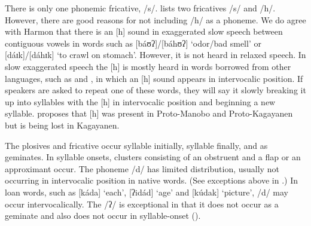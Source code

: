  There is only one phonemic fricative, /s/. \citet[21--22]{harmon1977} lists two fricatives /s/ and /h/. However, there are good reasons for not including /h/ as a phoneme. We do agree with Harmon that there is an [h] sound in exaggerated slow speech between contiguous vowels in words such as [báʊʔ]/[báhʊʔ] ‘odor/bad smell’ or [dáɪk]/[dáhɪk] ‘to crawl on stomach’. However, it is not heard in relaxed speech. In slow exaggerated speech the [h] is mostly heard in words borrowed from other languages, such as  and , in which an [h] sound appears in intervocalic position. If speakers are asked to repeat one of these words, they will say it slowly breaking it up into syllables with the [h] in intervocalic position and beginning a new syllable. \citet[23]{harmon1977} proposes that [h] was present in Proto-Manobo and Proto-Kagayanen but is being lost in Kagayanen.

The plosives and fricative occur syllable initially, syllable finally, and as geminates. In syllable onsets, clusters consisting of an obstruent and a flap or an approximant occur. The phoneme /d/ has limited distribution, usually not occurring in intervocalic position in native words. (See exceptions above in .) In loan words, such as [káda] ‘each’, [ʔidád] ‘age’ and [kúdak] ‘picture’, /d/ may occur intervocalically. The /ʔ/ is exceptional in that it does not occur as a geminate and also does not occur in syllable-onset  ().

